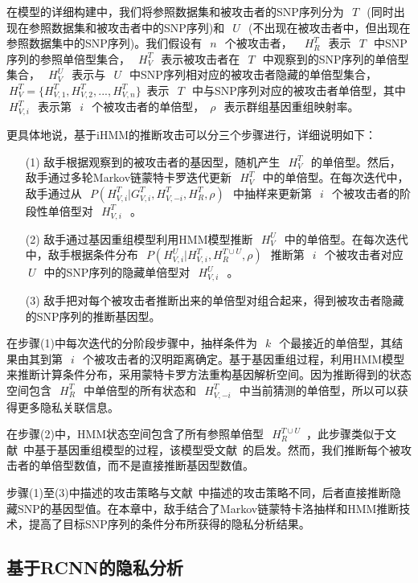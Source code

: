 在模型的详细构建中，我们将参照数据集和被攻击者的SNP序列分为~$~T~$~(同时出现在参照数据集和被攻击者中的SNP序列)和~$~U~$~(不出现在被攻击者中，但出现在参照数据集中的SNP序列)。我们假设有~$~n~$~个被攻击者， ~$~H_R^T~$~表示~$~T~$~中SNP序列的参照单倍型集合，~$~H_V^T~$~表示被攻击者在~$~T~$~中观察到的SNP序列的单倍型集合，~$~H_V^U~$~表示与~$~U~$~中SNP序列相对应的被攻击者隐藏的单倍型集合，~$~H_V^T=\{H_{V,1}^T,H_{V,2}^T,..., H_{V,n}^T\}$~表示~$~T~$~中与SNP序列对应的被攻击者单倍型，其中~$~H_{V,i}^T~$~表示第~$~i~$~个被攻击者的单倍型，~$\rho~$~表示群组基因重组映射率。

更具体地说，基于iHMM的推断攻击可以分三个步骤进行，详细说明如下：
\begin{enumerate}
	\item[(1)] 敌手根据观察到的被攻击者的基因型，随机产生~$~H_V^T~$~的单倍型。然后，敌手通过多轮Markov链蒙特卡罗迭代更新~$~H_V^T~$~中的单倍型。在每次迭代中，敌手通过从~$~P(H_{V,i}^T|G_{V,i}^T,H_{V,-i}^T,H_R^T,\rho)~$~中抽样来更新第~$~i~$~个被攻击者的阶段性单倍型对~$~H_{V,i}^T~$~。
	\item[(2)] 敌手通过基因重组模型利用HMM模型推断~$~H_V^U~$~中的单倍型。在每次迭代中，敌手根据条件分布~$~P(H_{V,i}^U|H_{V,i}^T, H_R^{T \cup U},\rho)~$~推断第~$~i~$~个被攻击者对应~$~U~$~中的SNP序列的隐藏单倍型对~$~H_{V,i}^U~$~。 
	\item[(3)] 敌手把对每个被攻击者推断出来的单倍型对组合起来，得到被攻击者隐藏的SNP序列的推断基因型。
\end{enumerate}

在步骤(1)中每次迭代的分阶段步骤中，抽样条件为~$~k~$~个最接近的单倍型，其结果由其到第~$~i~$~个被攻击者的汉明距离确定。基于基因重组过程，利用HMM模型来推断计算条件分布，采用蒙特卡罗方法重构基因解析空间。因为推断得到的状态空间包含~$~H_R^T~$~中单倍型的所有状态和~$~H_{V,-i}^T~$~中当前猜测的单倍型，所以可以获得更多隐私关联信息。

在步骤(2)中，HMM状态空间包含了所有参照单倍型~$~H_R^{T \cup U}$~，此步骤类似于文献~\cite{samani2015quantifying}中基于基因重组模型的过程，该模型受文献~\cite{marchini2007newa}的启发。然而，我们推断每个被攻击者的单倍型数值，而不是直接推断基因型数值。

步骤(1)至(3)中描述的攻击策略与文献~\cite{samani2015quantifying}中描述的攻击策略不同，后者直接推断隐藏SNP的基因型值。在本章中，敌手结合了Markov链蒙特卡洛抽样和HMM推断技术，提高了目标SNP序列的条件分布所获得的隐私分析结果。

\subsection{基于RCNN的隐私分析}

